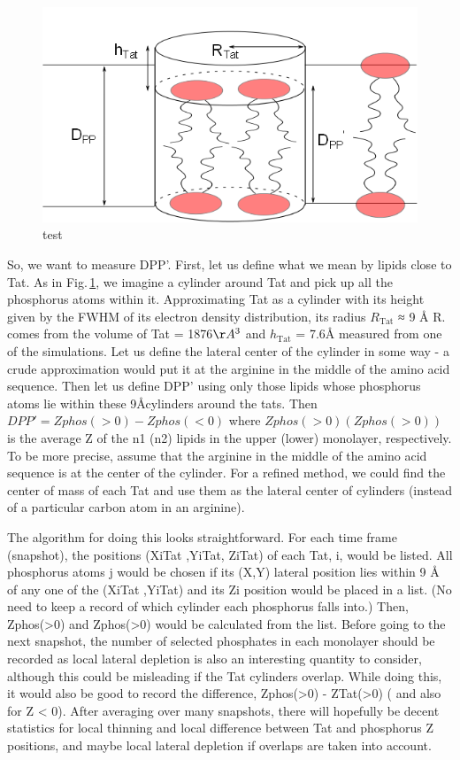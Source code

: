 \documentclass[12pt,letterpaper]{article}
\newcommand{\htat}{h_\mathrm{Tat}}
\begin{document}
\begin{figure}[htbp]
  \centering
  \includegraphics[scale=0.5]{./figures/cylinder_model}
  \caption{test}
  \label{fig:cylinder_model}
\end{figure}
So, we want to measure DPP'.  First, let us define what we mean by lipids 
close to Tat.  As in Fig.\,\ref{fig:cylinder_model}, we imagine a cylinder around Tat and 
pick up all the phosphorus atoms within it.  Approximating Tat as a cylinder 
with its height given by the FWHM of its electron density distribution, its 
radius $R_\mathrm{Tat}$ ≈ 9 Å R. comes from the volume of Tat = 1876$\AA^3$ and 
$\htat$ = 7.6\AA
measured from one of the simulations. Let us define the lateral center of the 
cylinder in some way - a crude approximation would put it at the arginine in 
the middle of the amino acid sequence. Then let us define DPP' using only 
those lipids whose phosphorus atoms lie within these 9\AA cylinders around the 
tats. Then $DPP' = Zphos (>0) - Zphos (<0)$ where $Zphos(>0) (Zphos(>0))$ 
is the 
average Z of the n1 (n2) lipids in the upper (lower) monolayer, respectively.  
To be more precise, assume that the arginine in the middle of the amino acid 
sequence is at the center of the cylinder. For a refined method, we could find 
the center of mass of each Tat and use them as the lateral center of cylinders 
(instead of a particular carbon atom in an arginine). 

The algorithm for doing this looks straightforward.  For each time frame 
(snapshot), the positions (XiTat ,YiTat, ZiTat) of each Tat, i,  would be listed.   
All phosphorus atoms j would be chosen if its (X,Y) lateral position lies within 
9 Å of any one of the (XiTat ,YiTat) and its Zi position would be placed in a 
list. (No need to keep a record of which cylinder each phosphorus falls into.)  
Then, Zphos(>0) and Zphos(>0) would be calculated from the list.  Before going 
to the next snapshot, the number of selected phosphates in each monolayer should 
be recorded as local lateral depletion is also an interesting quantity to consider, 
although this could be misleading if the Tat cylinders overlap.  While doing this, 
it would also be good to record the difference, Zphos(>0) - ZTat(>0) ( and also for Z < 0).
After averaging over many snapshots, there will hopefully be decent statistics 
for local thinning and local difference between Tat and phosphorus Z positions, 
and maybe local lateral depletion if overlaps are taken into account.  
\end{document}
